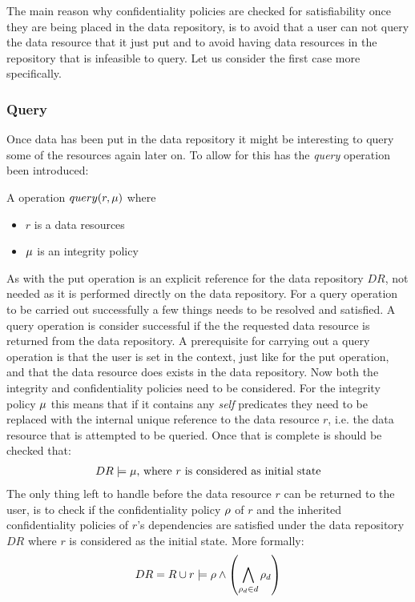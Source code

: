 The main reason why confidentiality policies are checked for satisfiability once they are being placed in the data repository, is to avoid that a user can not query the data resource that it just put and to avoid having data resources in the repository that is infeasible to query. Let us consider the first case more specifically.

\begin{example}
\end{example}

\subsubsection{Query}\label{sec:query}
Once data has been put in the data repository it might be interesting to query some of the resources again later on. To allow for this has the \emph{query} operation been introduced:
\begin{definition}
A operation $query(r, \mu)$ where
\begin{itemize}
  \item $r$ is a data resources
  \item $\mu$ is an integrity policy
\end{itemize}
\end{definition}
As with the put operation is an explicit reference for the data repository $DR$, not needed as it is performed directly on the data repository. For a query operation to be carried out successfully a few things needs to be resolved and satisfied. A query operation is consider successful if the the requested data resource is returned from the data repository. A prerequisite for carrying out a query operation is that the user is set in the context, just like for the put operation, and that the data resource does exists in the data repository. Now both the integrity and confidentiality policies need to be considered. For the integrity policy $\mu$ this means that if it contains any \emph{self} predicates they need to be replaced with the internal unique reference to the data resource $r$, i.e. the data resource that is attempted to be queried. Once that is complete is should be checked that:
\begin{align*}
    DR \models \mu \text{, where $r$ is considered as initial state}
\end{align*}
The only thing left to handle before the data resource $r$ can be returned to the user, is to check if the confidentiality policy $\rho$ of $r$ and the inherited confidentiality policies of $r$'s dependencies are satisfied under the data repository $DR$ where $r$ is considered as the initial state. More formally:
\begin{align*}
    DR = R \cup r \models \rho \land \left( \bigwedge\limits_{\rho_d \in d} \rho_d \right)
\end{align*}


\begin{example}
\end{example}